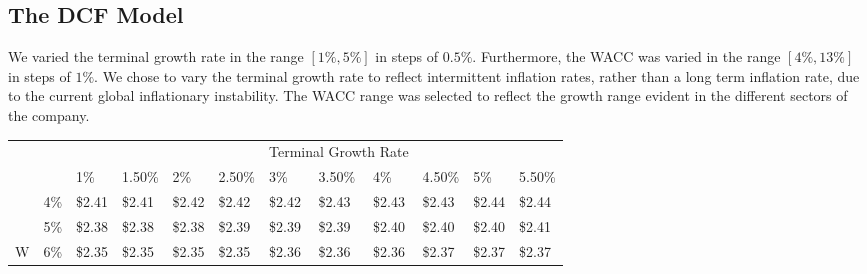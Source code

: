 \documentclass{article}
\begin{document}
\subsection{The DCF Model}

We varied the terminal growth rate in the range $[1\%, 5\%]$ in steps of $0.5\%$.
Furthermore, the WACC was varied in the range $[4\%, 13\%]$ in steps of $1\%$.
We chose to vary the terminal growth rate to reflect intermittent inflation rates, rather than a long term inflation rate, due to the current global inflationary instability.
The WACC range was selected to reflect the growth range evident in the different sectors of the company.

\begin{table}[h]
\begin{tabular}{llllllllllll}
                       &                           &                             &                             &                             &                                                     & \multicolumn{3}{l}{Terminal Growth Rate}                                                &                             &                             &                             \\ \cline{2-12} 
\multicolumn{1}{l|}{}  & \multicolumn{1}{l|}{}     & \multicolumn{1}{l|}{1\%}    & \multicolumn{1}{l|}{1.50\%} & \multicolumn{1}{l|}{2\%}    & \multicolumn{1}{l|}{2.50\%}                         & \multicolumn{1}{l|}{3\%}    & \multicolumn{1}{l|}{3.50\%} & \multicolumn{1}{l|}{4\%}    & \multicolumn{1}{l|}{4.50\%} & \multicolumn{1}{l|}{5\%}    & \multicolumn{1}{l|}{5.50\%} \\ \cline{2-12} 
\multicolumn{1}{l|}{}  & \multicolumn{1}{l|}{4\%}  & \multicolumn{1}{l|}{\$2.41} & \multicolumn{1}{l|}{\$2.41} & \multicolumn{1}{l|}{\$2.42} & \multicolumn{1}{l|}{\$2.42}                         & \multicolumn{1}{l|}{\$2.42} & \multicolumn{1}{l|}{\$2.43} & \multicolumn{1}{l|}{\$2.43} & \multicolumn{1}{l|}{\$2.43} & \multicolumn{1}{l|}{\$2.44} & \multicolumn{1}{l|}{\$2.44} \\ \cline{2-12} 
\multicolumn{1}{l|}{}  & \multicolumn{1}{l|}{5\%}  & \multicolumn{1}{l|}{\$2.38} & \multicolumn{1}{l|}{\$2.38} & \multicolumn{1}{l|}{\$2.38} & \multicolumn{1}{l|}{\cellcolor[HTML]{FFFF00}\$2.39} & \multicolumn{1}{l|}{\$2.39} & \multicolumn{1}{l|}{\$2.39} & \multicolumn{1}{l|}{\$2.40} & \multicolumn{1}{l|}{\$2.40} & \multicolumn{1}{l|}{\$2.40} & \multicolumn{1}{l|}{\$2.41} \\ \cline{2-12} 
\multicolumn{1}{r|}{W} & \multicolumn{1}{l|}{6\%}  & \multicolumn{1}{l|}{\$2.35} & \multicolumn{1}{l|}{\$2.35} & \multicolumn{1}{l|}{\$2.35} & \multicolumn{1}{l|}{\$2.35}                         & \multicolumn{1}{l|}{\$2.36} & \multicolumn{1}{l|}{\$2.36} & \multicolumn{1}{l|}{\$2.36} & \multicolumn{1}{l|}{\$2.37} & \multicolumn{1}{l|}{\$2.37} & \multicolumn{1}{l|}{\$2.37} \\ \cline{2-12} 

\end{tabular}
\end{table}
\end{document}
